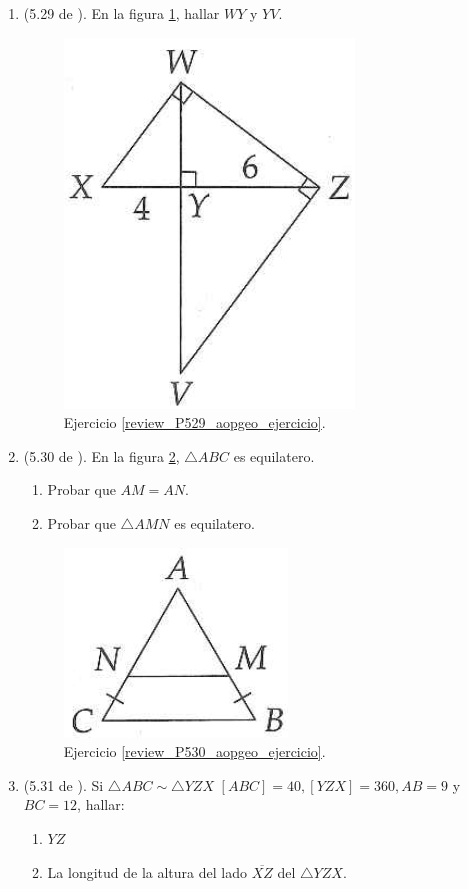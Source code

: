 \begin{enumerate}
		\item \label{review_P529_aopgeo_ejercicio} (5.29 de \cite{Aops_Geometria}). En la figura \ref{review_529_aopgeo_ejer}, hallar $WY$ y $YV$.
		\begin{figure}[H]
			\centering
			\includegraphics[width=0.3\linewidth]{Geometria/imgs/review_529_aopgeo_ejer}
			\caption{Ejercicio \ref{review_P529_aopgeo_ejercicio}.}
			\label{review_529_aopgeo_ejer}
		\end{figure}
		
		\item \label{review_P530_aopgeo_ejercicio} (5.30 de \cite{Aops_Geometria}). En la figura \ref{review_530_aopgeo_ejer}, $\triangle ABC$ es equilatero.
				\begin{enumerate}[label=\Alph*)]
					\item Probar que $AM=AN$.
					\item Probar que $\triangle AMN$ es equilatero.
				\end{enumerate}
		\begin{figure}[H]
			\centering
			\includegraphics[width=0.28\linewidth]{Geometria/imgs/review_530_aopgeo_ejer}
			\caption{Ejercicio \ref{review_P530_aopgeo_ejercicio}.}
			\label{review_530_aopgeo_ejer}
		\end{figure}
		
		\item \label{review_P531_aopgeo_ejercicio} (5.31 de \cite{Aops_Geometria}). Si $\triangle ABC \sim \triangle YZX$ $[ABC]=40,[YZX]=360,AB=9$ y $BC=12$, hallar:
		\begin{enumerate}[label=\Alph*)]
			\item $YZ$
			\item La longitud de la altura del lado $\overline{XZ}$ del $\triangle YZX$.
		\end{enumerate}
		

\end{enumerate}
